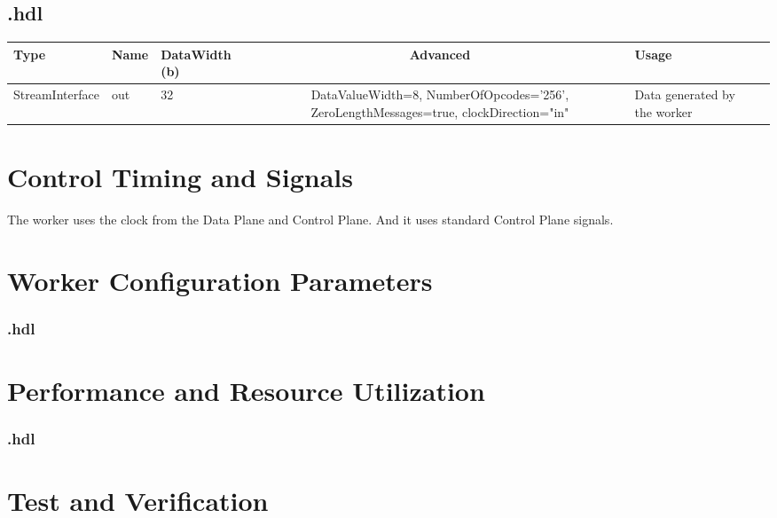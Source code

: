 \begin{landscape}
\subsection*{\comp.hdl}
\begin{scriptsize}
\begin{tabular}{|M{2.5cm}|M{2.5cm}|M{3.5cm}|c|M{3.5cm}|M{3.5cm}|}
            \hline
            Type    & Name & DataWidth (b) & Advanced  & Usage     \\
            \hline
            StreamInterface & out   & 32  & DataValueWidth=8, NumberOfOpcodes='256', ZeroLengthMessages=true, clockDirection="in"  & Data generated by the worker \\
           \hline
\end{tabular}
\end{scriptsize}
\end{landscape}

\section*{Control Timing and Signals}
\begin{flushleft}
The {\comp} worker uses the clock from the Data Plane and Control Plane. And it uses standard Control Plane signals.
\end{flushleft}

\begin{landscape}
\section*{Worker Configuration Parameters}
\subsubsection*{\comp.hdl}
%
\section*{Performance and Resource Utilization}
\subsubsection*{\comp.hdl}
%
\end{landscape}


\section*{Test and Verification}
\normalsize

